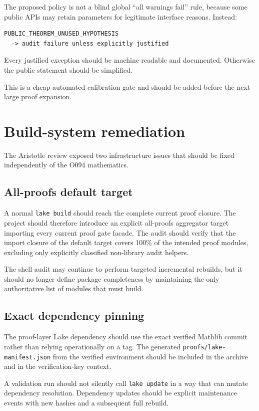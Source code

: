 \documentclass[11pt,a4paper]{article}
\begin{document}
The proposed policy is not a blind global ``all warnings fail'' rule, because some public APIs may retain parameters for legitimate interface reasons. Instead:

\begin{lstlisting}
PUBLIC_THEOREM_UNUSED_HYPOTHESIS
  -> audit failure unless explicitly justified
\end{lstlisting}

Every justified exception should be machine-readable and documented. Otherwise the public statement should be simplified.

This is a cheap automated calibration gate and should be added before the next large proof expansion.

\section{Build-system remediation}

The Aristotle review exposed two infrastructure issues that should be fixed independently of the O094 mathematics.

\subsection{All-proofs default target}

A normal \texttt{lake build} should reach the complete current proof closure. The project should therefore introduce an explicit all-proofs aggregator target importing every current proof gate facade. The audit should verify that the import closure of the default target covers 100\% of the intended proof modules, excluding only explicitly classified non-library audit helpers.

The shell audit may continue to perform targeted incremental rebuilds, but it should no longer define package completeness by maintaining the only authoritative list of modules that must build.

\subsection{Exact dependency pinning}

The proof-layer Lake dependency should use the exact verified Mathlib commit rather than relying operationally on a tag. The generated \texttt{proofs/lake-manifest.json} from the verified environment should be included in the archive and in the verification-key context.

A validation run should not silently call \texttt{lake update} in a way that can mutate dependency resolution. Dependency updates should be explicit maintenance events with new hashes and a subsequent full rebuild.
\end{document}
